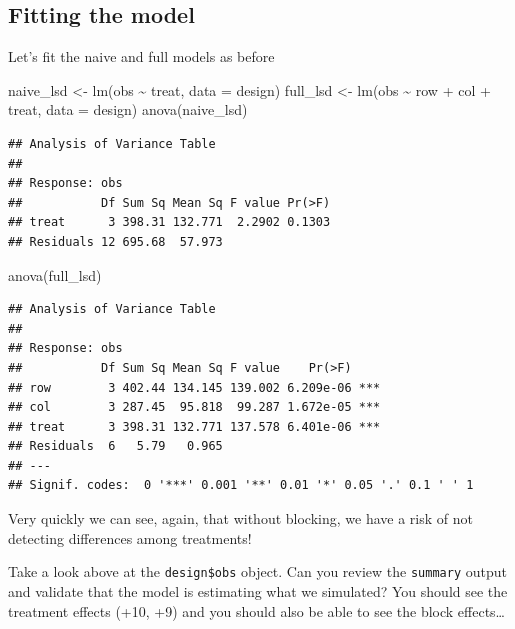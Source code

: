 \documentclass[
]{book}
\newenvironment{Shaded}{\begin{snugshade}}{\end{snugshade}}
\newcommand{\AttributeTok}[1]{\textcolor[rgb]{0.77,0.63,0.00}{#1}}
\newcommand{\FunctionTok}[1]{\textcolor[rgb]{0.00,0.00,0.00}{#1}}
\newcommand{\NormalTok}[1]{#1}
\newcommand{\OtherTok}[1]{\textcolor[rgb]{0.56,0.35,0.01}{#1}}
\newcommand{\SpecialCharTok}[1]{\textcolor[rgb]{0.00,0.00,0.00}{#1}}
\begin{document}
\hypertarget{fitting-the-model}{%
\subsection{Fitting the model}\label{fitting-the-model}}

Let's fit the naive and full models as before

\begin{Shaded}
\begin{Highlighting}[]
\NormalTok{naive\_lsd }\OtherTok{\textless{}{-}} \FunctionTok{lm}\NormalTok{(obs }\SpecialCharTok{\textasciitilde{}}\NormalTok{ treat, }\AttributeTok{data =}\NormalTok{ design)}
\NormalTok{full\_lsd }\OtherTok{\textless{}{-}} \FunctionTok{lm}\NormalTok{(obs }\SpecialCharTok{\textasciitilde{}}\NormalTok{ row }\SpecialCharTok{+}\NormalTok{ col }\SpecialCharTok{+}\NormalTok{ treat, }\AttributeTok{data =}\NormalTok{ design)}
\FunctionTok{anova}\NormalTok{(naive\_lsd)}
\end{Highlighting}
\end{Shaded}

\begin{verbatim}
## Analysis of Variance Table
## 
## Response: obs
##           Df Sum Sq Mean Sq F value Pr(>F)
## treat      3 398.31 132.771  2.2902 0.1303
## Residuals 12 695.68  57.973
\end{verbatim}

\begin{Shaded}
\begin{Highlighting}[]
\FunctionTok{anova}\NormalTok{(full\_lsd)}
\end{Highlighting}
\end{Shaded}

\begin{verbatim}
## Analysis of Variance Table
## 
## Response: obs
##           Df Sum Sq Mean Sq F value    Pr(>F)    
## row        3 402.44 134.145 139.002 6.209e-06 ***
## col        3 287.45  95.818  99.287 1.672e-05 ***
## treat      3 398.31 132.771 137.578 6.401e-06 ***
## Residuals  6   5.79   0.965                      
## ---
## Signif. codes:  0 '***' 0.001 '**' 0.01 '*' 0.05 '.' 0.1 ' ' 1
\end{verbatim}

Very quickly we can see, again, that without blocking, we have a risk of not detecting differences among treatments!

Take a look above at the \texttt{design\$obs} object. Can you review the \texttt{summary} output and validate that the model is estimating what we simulated? You should see the treatment effects (+10, +9) and you should also be able to see the block effects\ldots{}
\end{document}
